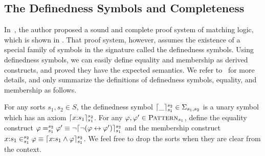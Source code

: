 \documentclass{amsart}
\begin{document}
\subsection{The Definedness Symbols and Completeness}

In~\cite{rosu-2017-lmcs},
the author proposed a sound and complete proof system of matching logic,
which is shown in .
That proof system, however, assumes the existence of
a special family of symbols in the signature called the definedness symbols.
Using definedness symbols,
we can easily define equality and membership
as derived constructs,
and proved they have the expected semantics.
We refer to~\cite{rosu-2017-lmcs} for more details,
and only summarize the definitions of definedness symbols, 
equality, and membership as follows.

\begin{definition}
For any sorts $s_1,s_2 \in S$, the definedness symbol
$\lceil\_\rceil_{s_1}^{s_2} \in \Sigma_{s_1,s_2}$
is a unary symbol which has an axiom
$
\lceil x {:} s_1\rceil_{s_1}^{s_2}
$.
For any $\varphi,\varphi' \in \textnormal{\textsc{Pattern}}_{s_1}$,
define the equality construct
$
\varphi =_{s_1}^{s_2} \varphi'
\equiv
\neg \lceil \neg ( \varphi \leftrightarrow \varphi' ) \rceil_{s_1}^{s_2}
$
and the membership construct
$
x {:} s_1 \in_{s_1}^{s_2} \varphi
\equiv
\lceil x {:} s_1 \wedge \varphi \rceil_{s_1}^{s_2}
$.
We feel free to drop the sorts when they are clear from the context.
\end{definition}
\end{document}
